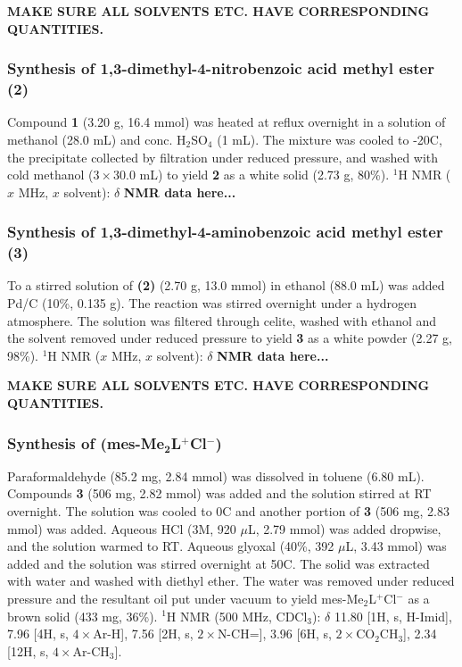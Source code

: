 \documentclass[12pt,a4paper]{article}
\begin{document}
\textbf{MAKE SURE ALL SOLVENTS ETC. HAVE CORRESPONDING QUANTITIES.}

\subsubsection{Synthesis of 1,3-dimethyl-4-nitrobenzoic acid methyl ester \textbf{(2)}}\label{synth:mes-L-step3}
Compound \textbf{1} (3.20 g, 16.4 mmol) was heated at reflux overnight in a solution of methanol (28.0 mL) and conc. H$_2$SO$_4$ (1 mL). The mixture was cooled to -20\degree C, the precipitate collected by filtration under reduced pressure, and washed with cold methanol ($3\times 30.0$ mL) to yield \textbf{2} as a white solid (2.73 g, 80\%). $^1$H NMR ($x$ MHz, $x$ solvent): $\delta$ \textbf{NMR data here...}

\subsubsection{Synthesis of 1,3-dimethyl-4-aminobenzoic acid methyl ester \textbf{(3)}}\label{synth:mes-L-step4}
To a stirred solution of \textbf{(2)} (2.70 g, 13.0 mmol) in ethanol (88.0 mL) was added Pd/C (10\%, 0.135 g). The reaction was stirred overnight under a hydrogen atmosphere. The solution was filtered through celite, washed with ethanol and the solvent removed under reduced pressure to yield \textbf{3} as a white powder (2.27 g, 98\%). $^1$H NMR ($x$ MHz, $x$ solvent): $\delta$ \textbf{NMR data here...}

\textbf{MAKE SURE ALL SOLVENTS ETC. HAVE CORRESPONDING QUANTITIES.}

\subsubsection{Synthesis of (mes-Me$\bm{_2}$L$\bm{^+}$Cl$\bm{^-}$)}\label{synth:mes-L-step5}
Paraformaldehyde (85.2 mg, 2.84 mmol) was dissolved in toluene (6.80 mL). Compounds \textbf{3} (506 mg, 2.82 mmol) was added and the solution stirred at RT overnight. The solution was cooled to 0\degree C and another portion of \textbf{3} (506 mg, 2.83 mmol) was added. Aqueous HCl (3M, 920 $\mu$L, 2.79 mmol) was added dropwise, and the solution warmed to RT. Aqueous glyoxal (40\%, 392 $\mu$L, 3.43 mmol) was added and the solution was stirred overnight at 50\degree C. The solid was extracted with water and washed with diethyl ether. The water was removed under reduced pressure and the resultant oil put under vacuum to yield mes-Me$_2$L$^+$Cl$^-$ as a brown solid (433 mg, 36\%). $^1$H NMR (500 MHz, CDCl$_3$): $\delta$ 11.80 [1H, s, H-Imid], 7.96 [4H, s, $4\times$Ar-H], 7.56 [2H, s, $2\times$N-CH=], 3.96 [6H, s, $2\times$CO$_2$CH$_3$], 2.34 [12H, s, $4\times$Ar-CH$_3$].
\end{document}
